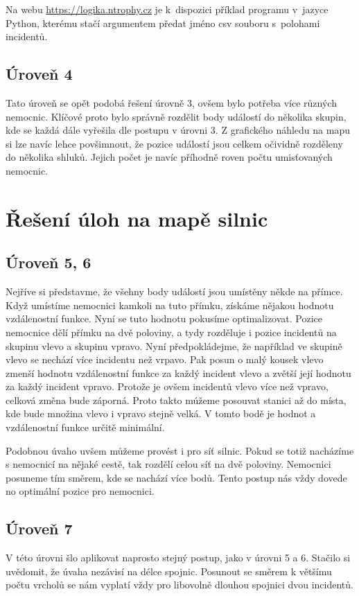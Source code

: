 \documentclass[12pt,a4paper]{article}
\begin{document}
Na webu \url{https://logika.ntrophy.cz} je k~dispozici příklad programu
v~jazyce Python, kterému stačí argumentem předat jméno csv souboru s~polohami
incidentů.

\subsection*{Úroveň 4}
Tato úroveň se opět podobá řešení úrovně 3, ovšem bylo potřeba více různých nemocnic. Klíčové proto bylo správně rozdělit body událostí do několika skupin, kde se každá dále vyřešila dle postupu v úrovni 3.
Z grafického náhledu na mapu si lze navíc lehce povšimnout, že pozice událostí jsou celkem očividně rozděleny do několika shluků. Jejich počet je navíc příhodně roven počtu umisťovaných nemocnic.

\section*{Řešení úloh na mapě silnic}
\subsection*{Úroveň 5, 6}
Nejříve si představme, že všehny body událostí jsou umístěny někde na přímce. Když umístíme nemocnici kamkoli na tuto přímku, získáme nějakou hodnotu vzdálenostní funkce.
Nyní se tuto hodnotu pokusíme optimalizovat. Pozice nemocnice dělí přímku na dvě poloviny, a tydy rozděluje i pozice incidentů na skupinu vlevo a skupinu vpravo.
Nyní předpokládejme, že například ve skupině vlevo se nechází více incidentu než vrpavo. Pak posun o malý kousek vlevo zmenší hodnotu vzdálenostní funkce za každý incident vlevo a zvětší její hodnotu za každý incident vpravo.
Protože je ovšem incidentů vlevo více než vpravo, celková změna bude záporná. Proto takto múžeme posouvat stanici až do místa, kde bude množina vlevo i vpravo stejně velká.
V tomto bodě je hodnot a vzdálenostní funkce určitě minimální.

Podobnou úvaho uvšem můžeme provést i pro síť silnic. Pokud se totiž nacházíme s nemocnicí na nějaké cestě, tak rozdělí celou síť na dvě poloviny. Nemocnici posuneme tím směrem, kde se nachází více bodů.
Tento postup nás vždy dovede no optimální pozice pro nemocnici.

\subsection*{Úroveň 7}
V této úrovni šlo aplikovat naprosto stejný postup, jako v úrovni 5 a 6. Stačilo si uvědomit, že úvaha nezávisí na délce spojnic. Posunout se směrem k většímu počtu vrcholů se nám vyplatí vždy pro libovolně dlouhou spojnici dvou incidentů.
\end{document}
